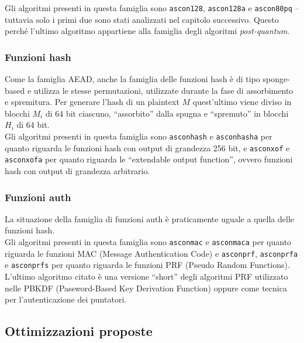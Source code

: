 \noindent Gli algoritmi presenti in questa famiglia sono \texttt{ascon128}, \texttt{ascon128a} e \texttt{ascon80pq} – tuttavia solo i primi due sono stati analizzati nel capitolo successivo. Questo perché l'ultimo algoritmo appartiene alla famiglia degli algoritmi \textit{post-quantum}. %

\subsubsection{Funzioni hash}

Come la famiglia AEAD, anche la famiglia delle funzioni hash è di tipo sponge-based e utilizza le stesse permutazioni, utilizzate durante la fase di assorbimento e spremitura. Per generare l'hash di un plaintext $M$ quest'ultimo viene diviso in blocchi $M_i$ di 64 bit ciascuno, ``assorbito'' dalla spugna e ``spremuto'' in blocchi $H_i$ di 64 bit. \\

\noindent Gli algoritmi presenti in questa famiglia sono \texttt{asconhash} e \texttt{asconhasha} per quanto riguarda le funzioni hash con output di grandezza 256 bit, e \texttt{asconxof} e \texttt{asconxofa} per quanto riguarda le ``extendable output function'', ovvero funzioni hash con output di grandezza arbitrario\cite{ascon-specification}.

\subsubsection{Funzioni auth}

La situazione della famiglia di funzioni auth è praticamente uguale a quella delle funzioni hash. \\

\noindent Gli algoritmi presenti in questa famiglia sono \texttt{asconmac} e \texttt{asconmaca} per quanto riguarda le funzioni MAC (Message Authentication Code) e \texttt{asconprf}, \texttt{asconprfa} e \texttt{asconprfs} per quanto riguarda le funzioni PRF (Pseudo Random Functions)\cite{ascon-specification-pdf}. L'ultimo algoritmo citato è una versione ``short'' degli algoritmi PRF utilizzato nelle PBKDF (Password-Based Key Derivation Function) oppure come tecnica per l'autenticazione dei puntatori.

\subsection{Ottimizzazioni proposte}

